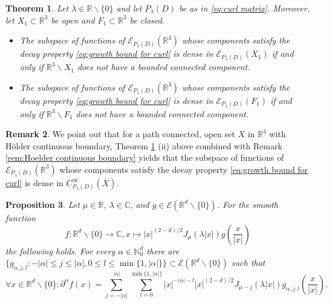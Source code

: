 \documentclass[a4paper,10pt]{amsart}
\newtheorem{theorem}{Theorem}
\newtheorem{proposition}[theorem]{Proposition}
\newtheorem*{crucial lemma}{Lemma \ref{lem:nice polynomial2}}
\theoremstyle{definition}
\newtheorem{remark}[theorem]{Remark}
\newcommand{\R}{\mathbb{R}}
\newcommand{\C}{\mathbb{C}}
\newcommand{\N}{\mathbb{N}}
\begin{document}
\begin{theorem}\label{th:EnPe}
	Let $\lambda\in\R\backslash\{0\}$ and let $P_\lambda(D)$ be as in \eqref{eq:curl matrix}. Moreover, let $X_1\subset\R^3$ be open and $F_1\subset\R^3$ be closed.
	\begin{itemize}
		\item[(i)] The subspace of functions of $\mathscr{E}_{P_\lambda(D)}(\R^3)$ whose components satisfy the decay property \eqref{eq:growth bound for curl} is dense in $\mathscr{E}_{P_\lambda(D)}(X_1)$ if and only if $\R^3\backslash X_1$ does not have a bounded connected component.
		\item[(ii)] The subspace of functions of $\mathscr{E}_{P_\lambda(D)}(\R^3)$ whose components satisfy the decay property \eqref{eq:growth bound for curl} is dense in $\mathscr{E}_{P_\lambda(D)}(F_1)$ if and only if $\R^3\backslash F_1$ does not have a bounded connected component.
	\end{itemize} 
\end{theorem}

\begin{remark}\label{rem:Peralta-Salas for path connected sets with Hoelder continuous boundary}
    We point out that for a path connected, open set $X$ in $\R^3$ with H\"older continuous boundary, Theorem \ref{th:EnPe} (ii) above combined with Remark \ref{rem:Hoelder continuous boundary} yields that the subspace of functions of $\mathscr{E}_{P_\lambda(D)}(\R^3)$ whose components satisfy the decay property \eqref{eq:growth bound for curl} is dense in $C^\infty_{P_{\lambda}(D)}(\overline{X})$. 
\end{remark}

\begin{proposition}\label{prop:elementary}
	Let $\mu\in\R$, $\lambda\in\C$, and $g\in \mathscr{E}(\R^d\backslash\{0\})$. For the smooth function
	\[f\colon\R^d\backslash\{0\}\rightarrow\C, x\mapsto |x|^{(2-d)/2}J_\mu(\lambda|x|) g\left(\frac{x}{|x|}\right)\]
	the following holds. For every $\alpha\in\N_0^d$ there are $\{g_{\alpha,j,l}\colon -|\alpha|\leq j\leq |\alpha|, 0\leq l\leq \min\{1,|\alpha|\}\}\subset \mathscr{E}(\R^d\backslash\{0\})$ such that
	\[\forall x\in\R^d\backslash\{0\}\colon \partial^\alpha f(x)=\sum_{j=-|\alpha|}^{|\alpha|}\sum_{l=0}^{\min\{1,|\alpha|\}} |x|^{-|\alpha|-l}|x|^{(2-d)/2}J_{\mu-j}(\lambda|x|)g_{\alpha,j,l}\left(\frac{x}{|x|}\right).\]
\end{proposition}
\end{document}
